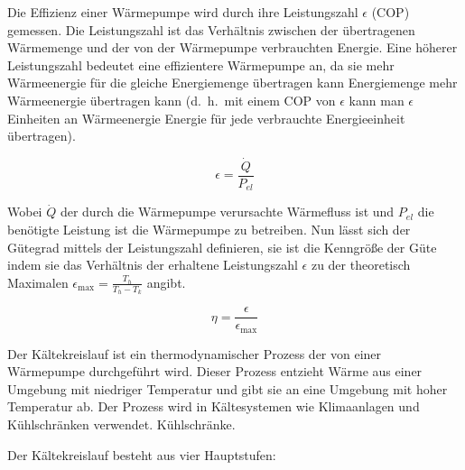 \documentclass[12pt,english,ngerman]{scrartcl}
\begin{document}
Die Effizienz einer Wärmepumpe wird durch ihre Leistungszahl $\epsilon$ (COP)
gemessen. Die Leistungszahl ist das Verhältnis zwischen der übertragenen
Wärmemenge und der von der Wärmepumpe verbrauchten Energie. Eine höherer
Leistungszahl bedeutet eine effizientere Wärmepumpe an, da sie mehr
Wärmeenergie für die gleiche Energiemenge übertragen kann Energiemenge mehr
Wärmeenergie übertragen kann (d.\ h.\ mit einem COP von $\epsilon$ kann man
$\epsilon$ Einheiten an Wärmeenergie Energie für jede verbrauchte
Energieeinheit übertragen).

\begin{equation}
	\epsilon = \frac{\dot{Q}}{P_{el}}
	\label{eq:Leistungszahl}
\end{equation}

Wobei $\dot{Q}$ der durch die Wärmepumpe verursachte Wärmefluss ist und
$P_{el}$ die benötigte Leistung ist die Wärmepumpe zu betreiben. Nun lässt sich
der Gütegrad mittels der Leistungszahl definieren, sie ist die Kenngröße der
Güte indem sie das Verhältnis der erhaltene Leistungszahl $\epsilon$ zu der
theoretisch Maximalen $\epsilon_\text{max} = \frac{T_h}{T_h-T_k}$ angibt.

\begin{equation}
	\eta = \frac{\epsilon}{\epsilon_\text{max}}
	\label{eq:guetefaktor}
\end{equation}

Der Kältekreislauf ist ein thermodynamischer Prozess der von einer Wärmepumpe
durchgeführt wird. Dieser Prozess entzieht Wärme aus einer Umgebung mit
niedriger Temperatur und gibt sie an eine Umgebung mit hoher Temperatur ab. Der
Prozess wird in Kältesystemen wie Klimaanlagen und Kühlschränken verwendet.
Kühlschränke.

Der Kältekreislauf besteht aus vier Hauptstufen:
\end{document}
